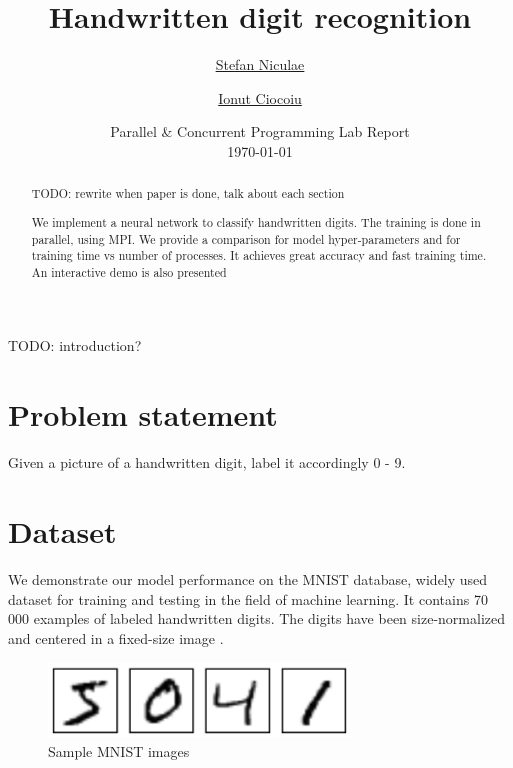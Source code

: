 \documentclass[a4paper]{article}
\begin{document}
	\title{
	\Huge Handwritten digit recognition
	}
	
	\vspace{2cm}
	
	\author{\Large \href{mailto:stefan.niculae@my.fmi.unibuc.ro}{Stefan Niculae} \and \Large \href{mailto:ionut.ciocoiu@my.fmi.unibuc.ro}{Ionut Ciocoiu}
	\vspace{3cm}}
	
	\date{
	\large Parallel \& Concurrent Programming Lab Report \\
    \vspace{0.2cm}
	\today
	}

	\maketitle
	\setlength{\parindent}{0pt}

\vspace{5cm}
\begin{abstract}
TODO: rewrite when paper is done, talk about each section

We implement a neural network to classify handwritten digits. The training is done in parallel, using MPI. We provide a comparison for model hyper-parameters and for training time vs number of processes. It achieves great accuracy and fast training time. An interactive demo is also presented
\end{abstract}






\newpage
TODO: introduction?

\section{Problem statement}
\label{sec:problem}
Given a picture of a handwritten digit, label it accordingly 0 - 9.

\section{Dataset}
\label{sec:dataset}
We demonstrate our model performance on the MNIST database, widely used dataset for training and testing in the field of machine learning. It contains 70 000 examples of labeled handwritten digits. The digits have been size-normalized and centered in a fixed-size image \cite{mnist}. 

\begin{figure}[htb]
\centering
\includegraphics[width=8cm]{images/mnist-images.png}
\caption{Sample MNIST images \cite{tf}}
\end{figure}
\end{document}
